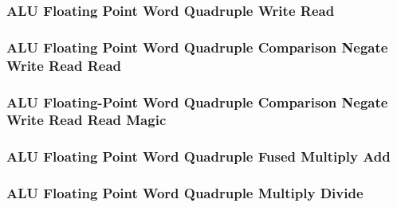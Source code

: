 

\subsubsection[{\small ALU Floating Point Word Quadruple Write Read}]{ALU Floating Point Word Quadruple Write Read} \label{sec:format-ALU-FWQWR}



\subsubsection[{\small ALU Floating Point Word Quadruple Comparison Negate Write Read Read}]{ALU Floating Point Word Quadruple Comparison Negate Write Read Read} \label{sec:format-ALU-FWQCNWRR}



\subsubsection[{\small ALU Floating-Point Word Quadruple Comparison Negate Write Read Read Magic}]{ALU Floating-Point Word Quadruple Comparison Negate Write Read Read Magic} \label{sec:format-ALU-FWQCNWRR.M}



\subsubsection[{\small ALU Floating Point Word Quadruple Fused Multiply Add}]{ALU Floating Point Word Quadruple Fused Multiply Add} \label{sec:format-ALU-FWQFMA}



\subsubsection[{\small ALU Floating Point Word Quadruple Multiply Divide}]{ALU Floating Point Word Quadruple Multiply Divide} \label{sec:format-ALU-FWQMUL}

